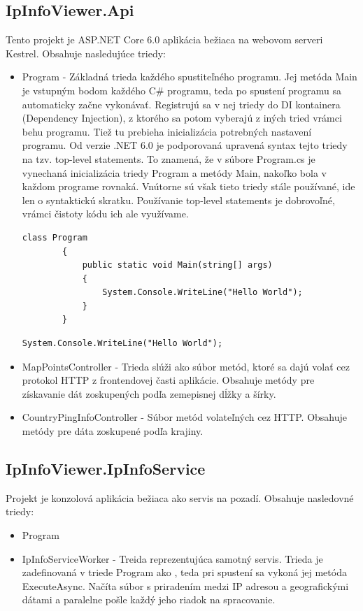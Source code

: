 \subsection{IpInfoViewer.Api}
Tento projekt je ASP.NET Core 6.0 aplikácia bežiaca na webovom serveri Kestrel. Obsahuje nasledujúce triedy: 
\begin{itemize}
    \item Program
    - Základná trieda každého spustiteľného programu. Jej metóda Main je vstupným bodom každého C\# programu, teda po spustení programu sa automaticky 
    začne vykonávať. Registrujú sa v nej triedy do DI kontainera (Dependency Injection), z ktorého sa potom vyberajú z iných tried vrámci behu programu. 
    Tiež tu prebieha inicializácia potrebných nastavení programu. Od verzie .NET 6.0 je podporovaná upravená syntax tejto triedy na tzv. top-level statements. 
    To znamená, že v súbore Program.cs je vynechaná inicializácia triedy Program a metódy Main, nakoľko bola v každom 
    programe rovnaká. Vnútorne sú však tieto triedy stále používané, ide len o syntaktickú skratku. Používanie top-level statements 
    je dobrovoľné, vrámci čistoty kódu ich ale využívame.
    \begin{lstlisting}[language={[Sharp]C},caption={Ukážka kódu triedy Program bez použitia top-level statements},label=alg:Program_Old]
        class Program 
        {
            public static void Main(string[] args) 
            {
                System.Console.WriteLine("Hello World");
            }
        }
    \end{lstlisting}
    \begin{lstlisting}[language={[Sharp]C},caption={Ukážka kódu triedy Program s použitím top-level statements},label=alg:Program_New]
        System.Console.WriteLine("Hello World");
    \end{lstlisting}
    \item MapPointsController
    - Trieda slúži ako súbor metód, ktoré sa dajú volať cez protokol HTTP z frontendovej časti aplikácie. Obsahuje metódy pre získavanie 
    dát zoskupených podľa zemepisnej dĺžky a šírky.
    \item CountryPingInfoController
    - Súbor metód volateľných cez HTTP. Obsahuje metódy pre dáta zoskupené podľa krajiny.
\end{itemize}
\subsection{IpInfoViewer.IpInfoService}
Projekt je konzolová aplikácia bežiaca ako servis na pozadí. Obsahuje nasledovné triedy:
\begin{itemize}
    \item Program
    \item IpInfoServiceWorker
    - Treida reprezentujúca samotný servis. Trieda je zadefinovaná v triede Program ako , teda pri spustení sa vykoná jej metóda ExecuteAsync. 
    Načíta súbor s priradením medzi IP adresou a geografickými dátami a paralelne pošle každý jeho riadok na spracovanie.
\end{itemize}
